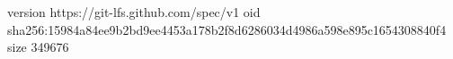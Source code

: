 version https://git-lfs.github.com/spec/v1
oid sha256:15984a84ee9b2bd9ee4453a178b2f8d6286034d4986a598e895c1654308840f4
size 349676
